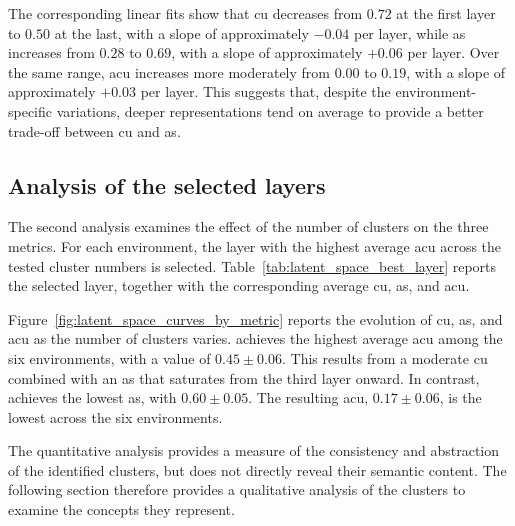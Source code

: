 The corresponding linear fits show that \gls{cu} decreases from $0.72$ at the first layer to $0.50$ at the last, with a slope of approximately $-0.04$ per layer, while \gls{as} increases from $0.28$ to $0.69$, with a slope of approximately $+0.06$ per layer.
Over the same range, \gls{acu} increases more moderately from $0.00$ to $0.19$, with a slope of approximately $+0.03$ per layer.
This suggests that, despite the environment-specific variations, deeper representations tend on average to provide a better trade-off between \gls{cu} and \gls{as}.



\subsection{Analysis of the selected layers}

The second analysis examines the effect of the number of clusters on the three metrics.
For each environment, the layer with the highest average \gls{acu} across the tested cluster numbers is selected.
Table~\ref{tab:latent_space_best_layer} reports the selected layer, together with the corresponding average \gls{cu}, \gls{as}, and \gls{acu}.

Figure~\ref{fig:latent_space_curves_by_metric} reports the evolution of \gls{cu}, \gls{as}, and \gls{acu} as the number of clusters varies.
\PongName achieves the highest average \gls{acu} among the six environments, with a value of $0.45 \pm 0.06$.
This results from a moderate \gls{cu} combined with an \gls{as} that saturates from the third layer onward.
In contrast, \MsPacManName achieves the lowest \gls{as}, with $0.60 \pm 0.05$.
The resulting \gls{acu}, $0.17 \pm 0.06$, is the lowest across the six environments.

The quantitative analysis provides a measure of the consistency and abstraction of the identified clusters, but does not directly reveal their semantic content.
The following section therefore provides a qualitative analysis of the clusters to examine the concepts they represent.

\vspace{1cm}


